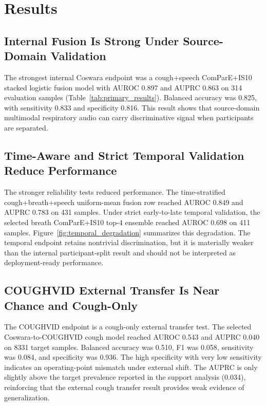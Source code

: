 \documentclass[journal]{IEEEtran}
\begin{document}
\section{Results}
\subsection{Internal Fusion Is Strong Under Source-Domain Validation}
The strongest internal Coswara endpoint was a cough+speech ComParE+IS10 stacked logistic fusion model with AUROC 0.897 and AUPRC 0.863 on 314 evaluation samples (Table~\ref{tab:primary_results}). Balanced accuracy was 0.825, with sensitivity 0.833 and specificity 0.816. This result shows that source-domain multimodal respiratory audio can carry discriminative signal when participants are separated.

\subsection{Time-Aware and Strict Temporal Validation Reduce Performance}
The stronger reliability tests reduced performance. The time-stratified cough+breath+speech uniform-mean fusion row reached AUROC 0.849 and AUPRC 0.783 on 431 samples. Under strict early-to-late temporal validation, the selected breath ComParE+IS10 top-4 ensemble reached AUROC 0.698 on 411 samples. Figure~\ref{fig:temporal_degradation} summarizes this degradation. The temporal endpoint retains nontrivial discrimination, but it is materially weaker than the internal participant-split result and should not be interpreted as deployment-ready performance.

\subsection{COUGHVID External Transfer Is Near Chance and Cough-Only}
The COUGHVID endpoint is a cough-only external transfer test. The selected Coswara-to-COUGHVID cough model reached AUROC 0.543 and AUPRC 0.040 on 8331 target samples. Balanced accuracy was 0.510, F1 was 0.058, sensitivity was 0.084, and specificity was 0.936. The high specificity with very low sensitivity indicates an operating-point mismatch under external shift. The AUPRC is only slightly above the target prevalence reported in the support analysis (0.034), reinforcing that the external cough transfer result provides weak evidence of generalization.
\end{document}

